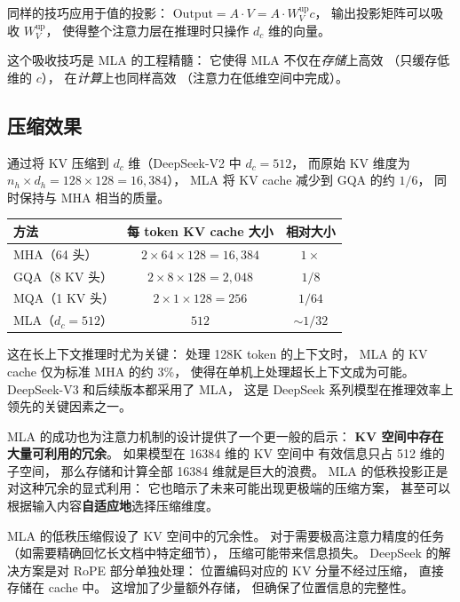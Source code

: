 同样的技巧应用于值的投影：
$\mathrm{Output} = A \cdot V = A \cdot W_V^{\mathrm{up}} c$，
输出投影矩阵可以吸收 $W_V^{\mathrm{up}}$，
使得整个注意力层在推理时只操作 $d_c$ 维的向量。

这个吸收技巧是 MLA 的工程精髓：
它使得 MLA 不仅在\emph{存储}上高效
（只缓存低维的 $c$），
在\emph{计算}上也同样高效
（注意力在低维空间中完成）。

\subsection{压缩效果}

通过将 KV 压缩到 $d_c$ 维（DeepSeek-V2 中 $d_c = 512$，
而原始 KV 维度为 $n_h \times d_h = 128 \times 128 = 16{,}384$），
MLA 将 KV cache 减少到 GQA 的约 $1/6$，
同时保持与 MHA 相当的质量。

\begin{center}\small
\renewcommand{\arraystretch}{1.3}
\begin{tabular}{lcc}
\toprule
\rowcolor{figLightGray}
\textbf{方法} & \textbf{每 token KV cache 大小} & \textbf{相对大小} \\
\midrule
MHA（64 头） & $2 \times 64 \times 128 = 16{,}384$ & $1\times$ \\
GQA（8 KV 头） & $2 \times 8 \times 128 = 2{,}048$ & $1/8$ \\
MQA（1 KV 头） & $2 \times 1 \times 128 = 256$ & $1/64$ \\
MLA（$d_c = 512$） & $512$ & $\sim 1/32$ \\
\bottomrule
\end{tabular}
\end{center}

这在长上下文推理时尤为关键：
处理 128K token 的上下文时，
MLA 的 KV cache 仅为标准 MHA 的约 3\%，
使得在单机上处理超长上下文成为可能。
DeepSeek-V3 和后续版本都采用了 MLA，
这是 DeepSeek 系列模型在推理效率上领先的关键因素之一。

MLA 的成功也为注意力机制的设计提供了一个更一般的启示：
\textbf{KV 空间中存在大量可利用的冗余}。
如果模型在 16384 维的 KV 空间中
有效信息只占 512 维的子空间，
那么存储和计算全部 16384 维就是巨大的浪费。
MLA 的低秩投影正是对这种冗余的显式利用：
它也暗示了未来可能出现更极端的压缩方案，
甚至可以根据输入内容\textbf{自适应地}选择压缩维度。

\begin{warnbox}
MLA 的低秩压缩假设了 KV 空间中的冗余性。
对于需要极高注意力精度的任务
（如需要精确回忆长文档中特定细节），
压缩可能带来信息损失。
DeepSeek 的解决方案是对 RoPE 部分单独处理：
位置编码对应的 KV 分量不经过压缩，
直接存储在 cache 中。
这增加了少量额外存储，
但确保了位置信息的完整性。
\end{warnbox}

